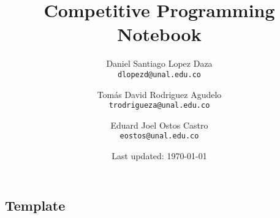 \documentclass[landscape, 9pt]{article}
\title{Competitive Programming Notebook} %
\author{
 Daniel Santiago Lopez Daza\\
   \texttt{dlopezd@unal.edu.co}
  \and
  Tomás David Rodriguez Agudelo\\
  \texttt{trodrigueza@unal.edu.co}
  \and
  Eduard Joel Ostos Castro\\
    \texttt{eostos@unal.edu.co}
}
\date{Last updated: \today}
\begin{document}
\maketitle
\newpage
\tableofcontents
\newpage
\begin{multicols}{2}
\section{Template}






\end{multicols}
\end{document}
